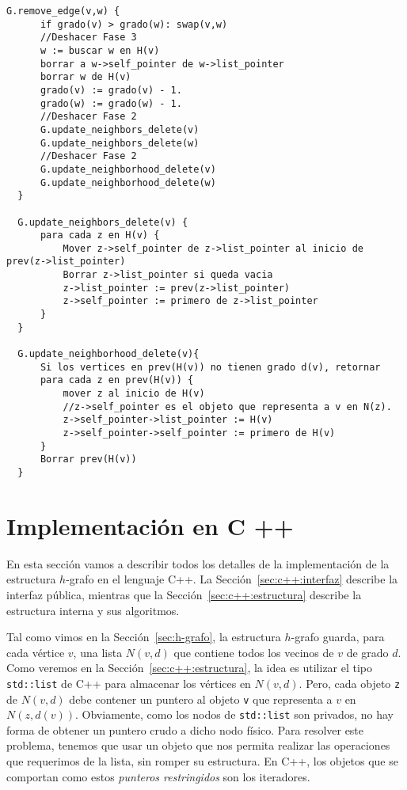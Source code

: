 \documentclass[a4paper,12pt]{article}
\makeatletter
\newcommand{\Code}[1]{\lstinline[basicstyle={\tt}]@#1@}
\makeatother
\begin{document}
\begin{lstlisting}[caption={Implementación de \Code{remove_edge}, deshaciendo las tres fases de la \Code{insert_edge}.},name=remove_edge,gobble=2,float=ht,label={lst:hgraph:remove_edge},commentstyle={\color{red}},morecomment={[l]{//}}]
  G.remove_edge(v,w) {
      if grado(v) > grado(w): swap(v,w)
      //Deshacer Fase 3
      w := buscar w en H(v)
      borrar a w->self_pointer de w->list_pointer
      borrar w de H(v)
      grado(v) := grado(v) - 1.
      grado(w) := grado(w) - 1.
      //Deshacer Fase 2
      G.update_neighbors_delete(v)
      G.update_neighbors_delete(w)
      //Deshacer Fase 2
      G.update_neighborhood_delete(v)
      G.update_neighborhood_delete(w)
  }
  
  G.update_neighbors_delete(v) {
      para cada z en H(v) {
          Mover z->self_pointer de z->list_pointer al inicio de prev(z->list_pointer)
          Borrar z->list_pointer si queda vacia
          z->list_pointer := prev(z->list_pointer)
          z->self_pointer := primero de z->list_pointer
      }
  }
  
  G.update_neighborhood_delete(v){
      Si los vertices en prev(H(v)) no tienen grado d(v), retornar
      para cada z en prev(H(v)) {
          mover z al inicio de H(v)
          //z->self_pointer es el objeto que representa a v en N(z).
          z->self_pointer->list_pointer := H(v)
          z->self_pointer->self_pointer := primero de H(v)
      }
      Borrar prev(H(v))
  }
\end{lstlisting}


\section{Implementación en C ++}
\label{sec:c++}

En esta sección vamos a describir todos los detalles de la implementación de la estructura $h$-grafo en el lenguaje C++.  La Sección~\ref{sec:c++:interfaz} describe la interfaz pública, mientras que la Sección~\ref{sec:c++:estructura} describe la estructura interna y sus algoritmos.  

Tal como vimos en la Sección~\ref{sec:h-grafo}, la estructura $h$-grafo guarda, para cada  vértice $v$, una lista $N(v, d)$ que contiene todos los vecinos de $v$ de grado $d$.  Como veremos en la Sección~\ref{sec:c++:estructura}, la idea es utilizar el tipo \texttt{std::list} de C++ para almacenar los vértices en $N(v, d)$.  Pero, cada objeto \texttt{z} de $N(v, d)$ debe contener un puntero al objeto \texttt{v} que representa a $v$ en $N(z, d(v))$.  Obviamente, como los nodos de \texttt{std::list} son privados, no hay forma de obtener un puntero crudo a dicho nodo físico.  Para resolver este problema, tenemos que usar un objeto que nos permita realizar las operaciones que requerimos de la lista, sin romper su estructura.  En C++, los objetos que se comportan como estos \emph{punteros restringidos} son los iteradores.  
\end{document}
